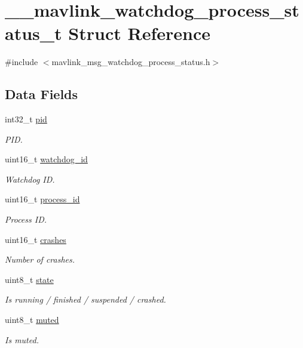 \hypertarget{struct____mavlink__watchdog__process__status__t}{\section{\+\_\+\+\_\+mavlink\+\_\+watchdog\+\_\+process\+\_\+status\+\_\+t Struct Reference}
\label{struct____mavlink__watchdog__process__status__t}
}


{\ttfamily \#include $<$mavlink\+\_\+msg\+\_\+watchdog\+\_\+process\+\_\+status.\+h$>$}

\subsection*{Data Fields}
\begin{DoxyCompactItemize}
\item 
int32\+\_\+t \hyperlink{struct____mavlink__watchdog__process__status__t_abd5306376d08bbd50a6a9be19f7d81da}{pid}
\begin{DoxyCompactList}\small\item\em P\+I\+D. \end{DoxyCompactList}\item 
uint16\+\_\+t \hyperlink{struct____mavlink__watchdog__process__status__t_a16977325eb65377b7a6a980aebc0738a}{watchdog\+\_\+id}
\begin{DoxyCompactList}\small\item\em Watchdog I\+D. \end{DoxyCompactList}\item 
uint16\+\_\+t \hyperlink{struct____mavlink__watchdog__process__status__t_a9015409cbff8b99580ec431b5d42b921}{process\+\_\+id}
\begin{DoxyCompactList}\small\item\em Process I\+D. \end{DoxyCompactList}\item 
uint16\+\_\+t \hyperlink{struct____mavlink__watchdog__process__status__t_ae17be9d24c9f395d4beac2723c3b391f}{crashes}
\begin{DoxyCompactList}\small\item\em Number of crashes. \end{DoxyCompactList}\item 
uint8\+\_\+t \hyperlink{struct____mavlink__watchdog__process__status__t_a5a11ccdd872a2e0d8c584af11247fe75}{state}
\begin{DoxyCompactList}\small\item\em Is running / finished / suspended / crashed. \end{DoxyCompactList}\item 
uint8\+\_\+t \hyperlink{struct____mavlink__watchdog__process__status__t_a829b64ca0a1cb06e4563bfd79dcc1f98}{muted}
\begin{DoxyCompactList}\small\item\em Is muted. \end{DoxyCompactList}\end{DoxyCompactItemize}


